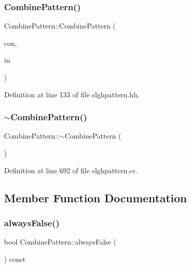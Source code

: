 \subsubsection{\texorpdfstring{CombinePattern()}{CombinePattern()}\hspace{0.1cm}{\footnotesize\ttfamily [2/2]}}
{\footnotesize\ttfamily Combine\+Pattern\+::\+Combine\+Pattern (\begin{DoxyParamCaption}\item[{\mbox{\hyperlink{class_context_pattern}{Context\+Pattern}} $\ast$}]{con,  }\item[{\mbox{\hyperlink{class_instruction_pattern}{Instruction\+Pattern}} $\ast$}]{in }\end{DoxyParamCaption})\hspace{0.3cm}{\ttfamily [inline]}}



Definition at line 133 of file slghpattern.\+hh.

\mbox{\label{class_combine_pattern_a348fa8ff77bfb2dff97ae5bcca90e299}} 
\subsubsection{\texorpdfstring{$\sim$CombinePattern()}{~CombinePattern()}}
{\footnotesize\ttfamily Combine\+Pattern\+::$\sim$\+Combine\+Pattern (\begin{DoxyParamCaption}\item[{void}]{ }\end{DoxyParamCaption})\hspace{0.3cm}{\ttfamily [virtual]}}



Definition at line 692 of file slghpattern.\+cc.



\subsection{Member Function Documentation}
\mbox{\label{class_combine_pattern_a48ba4c275b4c5fad7f06ca4fdd8ef0b5}} 
\subsubsection{\texorpdfstring{alwaysFalse()}{alwaysFalse()}}
{\footnotesize\ttfamily bool Combine\+Pattern\+::always\+False (\begin{DoxyParamCaption}\item[{void}]{ }\end{DoxyParamCaption}) const\hspace{0.3cm}{\ttfamily [virtual]}}



